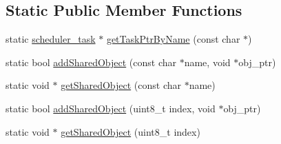 \subsection*{Static Public Member Functions}
\begin{DoxyCompactItemize}
\item 
static \hyperlink{classscheduler__task}{scheduler\+\_\+task} $\ast$ \hyperlink{classscheduler__task_a1481a58774523ce3eacfa725e1dc8e38}{get\+Task\+Ptr\+By\+Name} (const char $\ast$)
\end{DoxyCompactItemize}
{\bf }\par
\begin{DoxyCompactItemize}
\item 
static bool \hyperlink{classscheduler__task_aec090c5aa60ee653fca268b3c07d08ca}{add\+Shared\+Object} (const char $\ast$name, void $\ast$obj\+\_\+ptr)
\item 
static void $\ast$ \hyperlink{classscheduler__task_abd48cb80c9b16ad3193f49d33afe2fe0}{get\+Shared\+Object} (const char $\ast$name)
\end{DoxyCompactItemize}

{\bf }\par
\begin{DoxyCompactItemize}
\item 
static bool \hyperlink{classscheduler__task_aa2d3741fd75cbbe382fed9a037d7bd72}{add\+Shared\+Object} (uint8\+\_\+t index, void $\ast$obj\+\_\+ptr)
\item 
static void $\ast$ \hyperlink{classscheduler__task_a28ff469f99da08d112d391a5b294bd6b}{get\+Shared\+Object} (uint8\+\_\+t index)
\end{DoxyCompactItemize}

